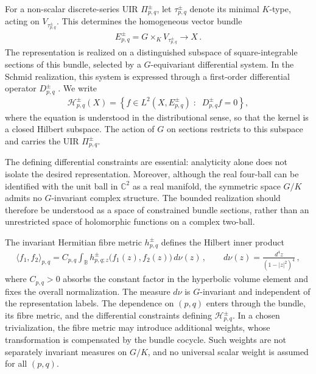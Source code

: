 \documentclass{SciPost}
\begin{document}
For a non-scalar discrete-series UIR $\Pi^\pm_{p,q}$, let $\tau^\pm_{p,q}$ denote its minimal $K$-type, acting on $V_{\tau^\pm_{p,q}}$. This determines the homogeneous vector bundle
\begin{align}\label{eq:compact-functions}
    E_{p,q}^{\pm}
    =G\times_K V_{\tau_{p,q}^{\pm}}
    \longrightarrow X \,.
\end{align}
The representation is realized on a distinguished subspace of square-integrable sections of this bundle, selected by a $G$-equivariant differential system. In the Schmid realization, this system is expressed through a first-order differential operator $D^\pm_{p,q}$ \cite{KnappWallach1976, KnappWallach1980, Seppanen2009}. We write
\begin{align}\label{eq:compact-Hilbert-space}
    \mathcal H_{p,q}^{\pm}(X)
    =
    \left\{
        f\in L^2(X,E_{p,q}^{\pm})
        \;\colon\;\; D_{p,q}^{\pm}f=0
    \right\},
\end{align}
where the equation is understood in the distributional sense, so that the kernel is a closed Hilbert subspace. The action of $G$ on sections restricts to this subspace and carries the UIR $\Pi^\pm_{p,q}$.

The defining differential constraints are essential: analyticity alone does not isolate the desired representation. Moreover, although the real four-ball can be identified with the unit ball in $\mathbb C^2$ as a real manifold, the symmetric space $G/K$ admits no $G$-invariant complex structure. The bounded realization should therefore be understood as a space of constrained bundle sections, rather than an unrestricted space of holomorphic functions on a complex two-ball.

The invariant Hermitian fibre metric $h_{p,q}^{\pm}$ defines the Hilbert inner product
\begin{align}\label{eq:compact-inner-product}
    \langle f_1,f_2\rangle_{p,q}
    =
    C_{p,q}\int_{\mathbb B}
    h_{p,q;z}^{\pm}\bigl(f_1(z),f_2(z)\bigr)\,d\nu(z)
    \,, \qquad
    d\nu(z)=\frac{d^4z}{(1-|z|^2)^4} \,,
\end{align}
where $C_{p,q}>0$ absorbs the constant factor in the hyperbolic volume element and fixes the overall normalization. The measure $d\nu$ is $G$-invariant and independent of the representation labels. The dependence on $(p,q)$ enters through the bundle, its fibre metric, and the differential constraints defining $\mathcal H^\pm_{p,q}$. In a chosen trivialization, the fibre metric may introduce additional weights, whose transformation is compensated by the bundle cocycle. Such weights are not separately invariant measures on $G/K$, and no universal scalar weight is assumed for all $(p,q)$.
\end{document}
